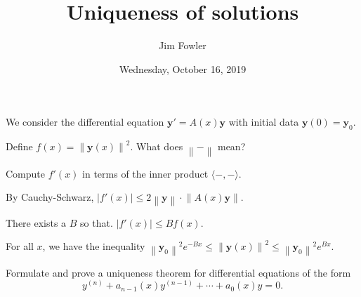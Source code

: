 \documentclass{homework}
\author{Jim Fowler}
\title{Uniqueness of solutions}
\date{Wednesday, October 16, 2019}
\newcommand{\norm}[1]{\left\lVert#1\right\rVert}
\begin{document}
\maketitle

We consider the differential equation $\mathbf{y}' = A(x) \mathbf{y}$ with initial data $\mathbf{y}(0) = \mathbf{y}_0$.

\begin{problem}
Define $f(x) = \norm{\mathbf{y}(x)}^2$.  What does $\norm{-}$ mean?
\end{problem}

\vfill

\begin{problem}
  Compute $f'(x)$ in terms of the inner product $\langle -,- \rangle$.
\end{problem}

\vfill

\begin{problem}
  By Cauchy-Schwarz, $\left| f'(x) \right| \leq 2 \norm{ \mathbf{y} } \cdot \norm{ A(x) \mathbf{y} }$.
\end{problem}

\vfill

\begin{problem}
  There exists a $B$ so that.
  $\left| f'(x) \right| \leq B f(x)$.
\end{problem}

\vfill

\begin{problem}
  For all $x$, we have the inequality $\norm{ \mathbf{y}_0 }^2 e^{-Bx } \leq \norm{ \mathbf{y}(x) }^2 \leq \norm{ \mathbf{y}_0 }^2 e^{B x}$.
\end{problem}

\vfill

\begin{problem}
  Formulate and prove a uniqueness theorem for differential equations of the form
  \[ y^{(n)} + a_{n-1}(x) y^{(n-1)} + \cdots + a_0(x) y = 0. \]

\end{problem}

\vfill
\end{document}
